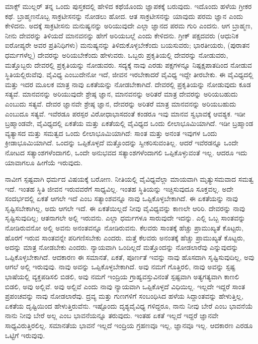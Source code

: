 ಮಾಕ್ಸ್ ಮುಲ್ಲರ್ ತನ್ನ ಒಂದು ಪುಸ್ತಕದಲ್ಲಿ ಹೇಳಿದ ಕಥೆಯೊಂದು ಜ್ಞಾಪಕಕ್ಕೆ ಬರುವುದು. ಇದೊಂದು ಹಳೆಯ ಗ್ರೀಕರ ಕಥೆ. ಬ್ರಾಹ್ಮಣನೊಬ್ಬ ಸಾಕ್ರಟೀಸನನ್ನು ನೋಡಲು ಹೋದ. ಆತ ಸಾಕ್ರಟೀಸನನ್ನು ಯಾವುದು ಪರಮ ಜ್ಞಾನ ಎಂದು ಕೇಳಿದನು. ಅದಕ್ಕೆ ಸಾಕ್ರಟೀಸನು ಮನುಷ್ಯನನ್ನು ಅರಿಯುವುದೇ ಎಲ್ಲಾ ಜ್ಞಾನದ ಪರಮ ಗುರಿ ಎಂದನು. ಆಗ ಬ್ರಾಹ್ಮಣ, ನೀನು ದೇವರನ್ನು ತಿಳಿಯದೆ ಮಾನವನನ್ನು ಹೇಗೆ ಅರಿಯಬಲ್ಲೆ ಎಂದು ಕೇಳಿದನು. ಗ್ರೀಕ್ ಪಕ್ಷದವರು (ಆಧುನಿಕ ಐರೋಪ್ಯರೇ ಅವರ ಪ್ರತಿನಿಧಿಗಳು) ಮನುಷ್ಯನನ್ನು ತಿಳಿದುಕೊಳ್ಳಬೇಕೆಂದು ಬಯಸುವರು; ಭಾರತೀಯರು, (ಪುರಾತನ ಧರ್ಮಗಳೆಲ್ಲ) ದೇವರನ್ನು ಅರಿಯಬೇಕೆಂದು ಹೇಳುವರು. ಒಬ್ಬರು ಪ್ರಕೃತಿಯಲ್ಲಿ ದೇವರನ್ನು ನೋಡುವರು, ಮತ್ತೊಬ್ಬರು ದೇವರಲ್ಲಿ ಪ್ರಕೃತಿಯನ್ನು ನೋಡುವರು. ಸದ್ಯಕ್ಕೆ ನಾವು ಎರಡು ಪಕ್ಷಗಳನ್ನೂ ನಿಷ್ಪಕ್ಷಪಾತದಿಂದ ನೋಡುವ ಸ್ಥಿತಿಯಲ್ಲಿರುವೆವು. ವೈವಿಧ್ಯ ಎಂಬುದೇನೋ ಇದೆ, ಜೀವನ ಇರಬೇಕಾದರೆ ವೈವಿಧ್ಯ ಇದ್ದೇ ತೀರಬೇಕು. ಈ ವೈವಿಧ್ಯದಲ್ಲಿ ಮತ್ತು ಇದರ ಮೂಲಕ ಮಾತ್ರ ನಾವು ಏಕತೆಯನ್ನು ನೋಡಬೇಕಾಗಿದೆ. ದೇವರಲ್ಲಿ ಪ್ರಕೃತಿಯನ್ನು ನೋಡುವುದು ಕೂಡ ಸತ್ಯವೆ. ಮಾನವನನ್ನು ಅರಿಯುವುದೇ ಶ್ರೇಷ್ಠ ಜ್ಞಾನ, ಮಾನವನನ್ನು ಅರಿತರೆ ಮಾತ್ರ ದೇವರನ್ನು ಅರಿಯಬಹುದು ಎಂಬುದು ಸತ್ಯವೆ. ದೇವರ ಜ್ಞಾನವೇ ಶ್ರೇಷ್ಠ ಜ್ಞಾನ, ದೇವರನ್ನು ಅರಿತರೆ ಮಾತ್ರ ಮಾನವನನ್ನು ಅರಿಯಬಹುದು ಎಂಬುದೂ ಸತ್ಯವೆ. ಇವೆರಡೂ ಪರಸ್ಪರ ವಿರೋಧಾಭಾಸದಂತೆ ಕಂಡರೂ ಇವು ಮಾನವ ಸ್ವಭಾವಕ್ಕೆ ಆವಶ್ಯಕ. ಇಡೀ ಬ್ರಹ್ಮಾಂಡವೇ, ವೈವಿಧ್ಯದಲ್ಲಿ ಏಕತೆಯ ಮತ್ತು ಏಕತೆಯಲ್ಲಿ ವೈವಿಧ್ಯದ ಒಂದು ಲೀಲಾಭೂಮಿಯಾಗಿದೆ. ಇಡೀ ಬ್ರಹ್ಮಾಂಡ ವ್ಯತ್ಯಾಸದ ಮತ್ತು ಸಮತ್ವದ ಒಂದು ಲೀಲಾಭೂಮಿಯಾಗಿದೆ: ಸಾಂತ ಮತ್ತು ಅನಂತ ಇವುಗಳ ಒಂದು ಕ್ರೀಡಾಭೂಮಿಯಾಗಿದೆ. ಒಂದನ್ನು ಒಪ್ಪಿಕೊಳ್ಳದೆ ಮತ್ತೊಂದನ್ನು ಸ್ವೀಕರಿಸುವಂತಿಲ್ಲ. ಆದರೆ ಇವೆರಡನ್ನೂ ಒಂದೇ ನೋಟದ ಸತ್ಯಾಂಶಗಳೆಂದಾಗಲಿ, ಒಂದೇ ಅನುಭವದ ಸತ್ಯಾಂಶಗಳೆಂದಾಗಲಿ ಒಪ್ಪಿಕೊಳ್ಳುವಂತೆ ಇಲ್ಲ. ಆದರೂ ಇದು ಯಾವಾಗಲೂ ಹೀಗೆಯೆ ಇರುವುದು.

ನಾವೀಗ ಸ್ಪಷ್ಟವಾಗಿ ಧರ್ಮದ ವಿಷಯಕ್ಕೆ ಬರೋಣ. ನೀತಿಯಲ್ಲಿ ವೈವಿಧ್ಯವೆಲ್ಲಾ ಮಾಯವಾಗಿ ಮೃತ್ಯುಸಮವಾದ ಸಮತ್ವ ಇದೆ. ಇಂತಹ ಸ್ಥಿತಿ ಜೀವನ ಇರುವವರೆಗೆ ಸಾಧ್ಯವಿಲ್ಲ. ಇಂತಹ ಸ್ಥಿತಿಯನ್ನು ಇಚ್ಚಿಸುವುದೂ ಸೂಕ್ತವಲ್ಲ. ಅದೇ ಸಂದರ್ಭದಲ್ಲಿ ಏಕತೆ ಆಗಲೇ ಇದೆ ಎಂಬ ಸತ್ಯಾಂಶವನ್ನೂ ನಾವು ಒಪ್ಪಿಕೊಳ್ಳಬೇಕಾಗಿದೆ. ಈ ಏಕತೆಯನ್ನು ನಾವು ಸೃಷ್ಟಿಸಬೇಕಾಗಿಲ್ಲ, ಅದು ಆಗಲೇ ಇದೆ. ಈ ಏಕತೆಯಿಲ್ಲದೆ ನೀವು ವೈವಿಧ್ಯವನ್ನು ಕಾಣಲೇ ಆರಿರಿ. ದೇವರನ್ನು ನಾವು ಸೃಷ್ಟಿಸುವುದಿಲ್ಲ; ಆತನಾಗಲೇ ಅಲ್ಲಿ ಇರುವನು. ಎಲ್ಲಾ ಧರ್ಮಗಳೂ ಸಾರುವುದೇ ಇದನ್ನು. ಎಲ್ಲಿ ಒಬ್ಬ ಸಾಂತವನ್ನು ನೋಡಿರುವನೋ ಅಲ್ಲಿ ಅವನು ಅನಂತವನ್ನೂ ನೋಡಿರುವನು. ಕೆಲವರು ಸಾಂತಕ್ಕೆ ಹೆಚ್ಚು ಪ್ರಾಮುಖ್ಯತೆ ಕೊಟ್ಟರು, ಹೊರಗೆ ಇರುವ ಸಾಂತವನ್ನೇ ಪರಿಗಣಿಸಬೇಕು ಎಂದರು. ಮತ್ತೆ ಕೆಲವರು ಅನಂತಕ್ಕೆ ಹೆಚ್ಚು ಪ್ರಾಮುಖ್ಯತೆ ಕೊಟ್ಟರು, ಅದನ್ನು ಮಾತ್ರ ನೋಡಬೇಕು ಎಂದರು. ನ್ಯಾಯವಾಗಿ ಒಂದಿಲ್ಲದೆ ಮತ್ತೊಂದನ್ನು ನೋಡಲಾರೆವು ಎನ್ನುವುದನ್ನು ಒಪ್ಪಿಕೊಳ್ಳಬೇಕಾಗಿದೆ. ಆದಕಾರಣ ಈ ಸಮಾನತೆ, ಏಕತೆ, ಪೂರ್ಣತೆ ಇವನ್ನು ನಾವು ಹೊಸದಾಗಿ ಸೃಷ್ಟಿಸುವುದಿಲ್ಲ, ಅವು ಆಗಲೆ ಅಲ್ಲಿ ಇರುವುವು. ನಾವು ಅವನ್ನು ಒಪ್ಪಿಕೊಳ್ಳಬೇಕಾಗಿದೆ. ಅವು ನಮಗೆ ಗೊತ್ತಿರಲಿ, ನಾವು ಅವನ್ನು ಸ್ಪಷ್ಟ ಭಾಷೆಯಲ್ಲಿ ವ್ಯಕ್ತಪಡಿಸಲಿ ಬಿಡಲಿ, ಅವು ನಮಗೆ ಇಂದ್ರಿಯ ಗ್ರಾಹ್ಯವಸ್ತುವಿನಂತೆ ಸ್ಪಷ್ಟವಾಗಿ ಅತ್ಯಗತ್ಯವಾಗಿ ಕಾಣಲಿ ಬಿಡಲಿ, ಅವು ಅಲ್ಲಿವೆ. ಅವು ಅಲ್ಲಿವೆ ಎಂದು ನಾವು ನ್ಯಾಯವಾಗಿ ಒಪ್ಪಿಕೊಳ್ಳದೆ ವಿಧಿಯಿಲ್ಲ. ಇಲ್ಲದೇ ಇದ್ದರೆ ಸಾಂತ ಪ್ರಪಂಚವನ್ನು ನಾವು ನೋಡಲಾರೆವು. ದ್ರವ್ಯ ಮತ್ತು ಗುಣಗಳಿಗೆ ಸಂಬಂಧಿಸಿದ ಹಳೆಯ ಸಿದ್ದಾಂತವನ್ನು ಹೇಳುತ್ತಿಲ್ಲ, ಏಕತೆಯ ದೃಷ್ಟಿಯಿಂದ ಹೇಳುತ್ತಿರುವೆನು. ಇಷ್ಟೊಂದು ದೃಶ್ಯವೈವಿಧ್ಯ ಗಳಿದ್ದರೂ, ನಾನು ನೀವು ಬೇರೆ ಎಂಬ ಭಾವನೆಯೆ ನಾನು ನೀವು ಬೇರೆ ಅಲ್ಲ ಎಂಬ ಭಾವನೆಯನ್ನೂ ತರುವುದು. ಇಂತಹ ಏಕತೆ ಇಲ್ಲದೆ ಇದ್ದರೆ ಜ್ಞಾನವೇ ಸಾಧ್ಯವಿರುತ್ತಿರಲಿಲ್ಲ. ಸಮಾನತೆಯ ಭಾವನೆ ಇಲ್ಲದೆ ಇಂದ್ರಿಯ ಗ್ರಹಣವೂ ಇಲ್ಲ, ಜ್ಞಾನವೂ ಇಲ್ಲ. ಆದಕಾರಣ ಎರಡೂ ಒಟ್ಟಿಗೆ ಇರುವುವು.

